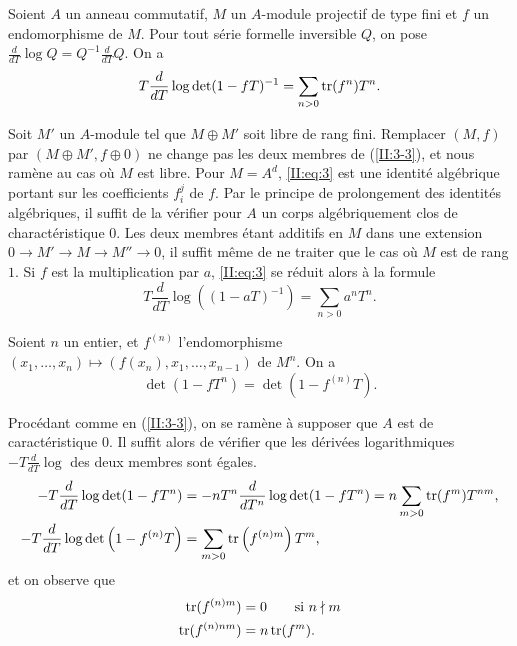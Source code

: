 \documentclass[oneside]{book}
\begin{document}
\begin{proposition_}\label{II:3-3}
Soient $A$ un anneau commutatif, $M$ un $A$-module projectif de type fini et 
$f$ un endomorphisme de $M$. Pour tout série formelle inversible $Q$, on pose 
$\frac{d}{dT}\log Q = Q^{-1}\frac{d}{dT}Q$. On a 
\begin{equation}\label{II:eq:3}
  T\frac{d}{dT}\log\det(1-f T)^{-1} = \sum_{n>0} \operatorname{tr}(f^n) T^n \text{.}
\end{equation}
\end{proposition_}

Soit $M'$ un $A$-module tel que $M\oplus M'$ soit libre de rang fini. 
Remplacer $(M,f)$ par $(M\oplus M',f\oplus 0)$ ne change pas les deux membres 
de (\ref{II:3-3}), et nous ramène au cas où $M$ est libre. Pour $M=A^d$, 
\eqref{II:eq:3} est une identité algébrique portant sur les coefficients 
$f_i^j$ de $f$. Par le principe de prolongement des identités algébriques, 
il suffit de la vérifier pour $A$ un corps algébriquement clos de 
charactéristique $0$. Les deux membres étant additifs en $M$ dans une 
extension $0\to M'\to M\to M''\to 0$, il suffit même de ne traiter que le cas 
où $M$ est de rang $1$. Si $f$ est la multiplication par $a$, \eqref{II:eq:3} 
se réduit alors à la formule 
\[
  T\frac{d}{dT}\log\left((1-a T)^{-1}\right) = \sum_{n>0} a^n T^n \text{.}
\]





\begin{corollary_}\label{II:3-4}
Soient $n$ un entier, et $f^{(n)}$ l'endomorphisme 
$(x_1,\dotsc,x_n)\mapsto \left(f(x_n),x_1,\dotsc,x_{n-1}\right)$ de $M^n$. 
On a 
\begin{equation}\label{II:eq:4}
  \det(1-f T^n) = \det(1-f^{(n)} T) \text{.}
\end{equation}
\end{corollary_}

Procédant comme en (\ref{II:3-3}), on se ramène à supposer que $A$ est de 
caractéristique $0$. Il suffit alors de vérifier que les dérivées 
logarithmiques $-T\frac{d}{dT}\log$ des deux membres sont égales. 
\begin{align*}
  -T\frac{d}{dT}\log\det(1-f T^n) &= - n T^n \frac{d}{dT^n} \log\det(1-f T^n) = n \sum_{m>0} \operatorname{tr}(f^m) T^{n m} \text{,} \\
  -T \frac{d}{dT}\log\det\left(1-f^{(n)} T\right) &= \sum_{m>0} \operatorname{tr}\left(f^{(n) m}\right) T^m \text{,}
\end{align*}
et on observe que 
\begin{align*}
  \operatorname{tr}(f^{(n) m}) &= 0 \qquad \text{si $n\nmid m$} \\
  \operatorname{tr}(f^{(n) n m}) &= n \operatorname{tr}(f^m) \text{.}
\end{align*}
\end{document}
